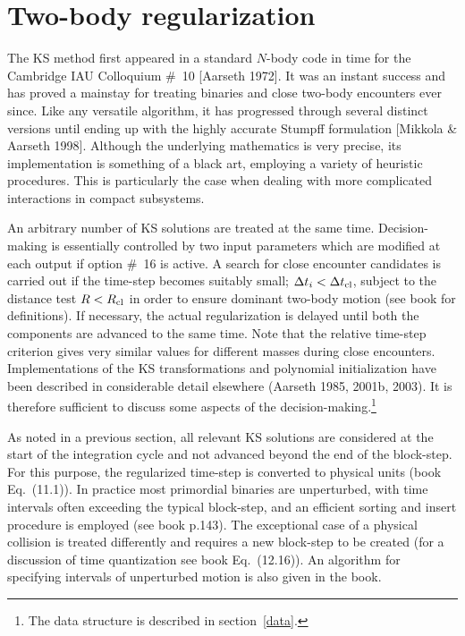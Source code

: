\documentclass[12pt]{article}
\begin{document}
\section{Two-body regularization}

The KS method first appeared in a standard $N$-body code in time for the
Cambridge IAU Colloquium \#~10 [Aarseth 1972].
It was an instant success and has proved a mainstay for treating binaries
and close two-body encounters ever since.
Like any versatile algorithm, it has progressed through several distinct
versions until ending up with the highly accurate Stumpff formulation
[Mikkola \& Aarseth 1998].
Although the underlying mathematics is very precise, its implementation is
something of a black art, employing a variety of heuristic procedures.
This is particularly the case when dealing with more complicated interactions
in compact subsystems.

An arbitrary number of KS solutions are treated at the same time.
Decision-making is essentially controlled by two input parameters which are
modified at each output if option \#~16 is active.
A search for close encounter candidates is carried out if the time-step
becomes suitably small; \ie ${\Delta t}_i < {\Delta t}_{\rm cl}$,
subject to the distance test $R < R_{\rm cl}$ in order to ensure dominant
two-body motion (see book for definitions).
If necessary, the actual regularization is delayed until both the components
are advanced to the same time.
Note that the relative time-step criterion gives very similar values for
different masses during close encounters.
Implementations of the KS transformations and polynomial initialization have
been described in considerable detail elsewhere (Aarseth 1985, 2001b, 2003).
It is therefore sufficient to discuss some aspects of the
decision-making.\footnote{The data structure is described in
section~\ref{data}.}

As noted in a previous section, all relevant KS solutions are considered
at the start of the integration cycle and not advanced beyond the end of the
block-step.
For this purpose, the regularized time-step is converted to physical units
(book Eq.~(11.1)).
In practice most primordial binaries are unperturbed, with time intervals
often exceeding the typical block-step, and an efficient sorting and insert
procedure is employed (see book p.143).
The exceptional case of a physical collision is treated differently and
requires a new block-step to be created (for a discussion of time
quantization see book Eq.~(12.16)).
An algorithm for specifying intervals of unperturbed motion is also given in
the book.
\end{document}
